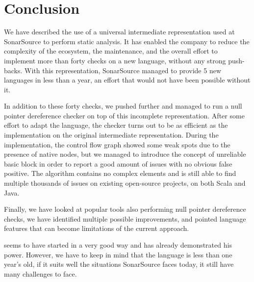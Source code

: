 \section{Conclusion}
\label{sec:conclusion}

We have described the use of a universal intermediate representation used at SonarSource to perform static analysis.
It has enabled the company to reduce the complexity of the ecosystem, the maintenance, and the overall effort to implement more than forty checks on a new language, without any strong push-backs.
With this representation, SonarSource managed to provide 5 new languages in less than a year, an effort that would not have been possible without it.

In addition to these forty checks, we pushed \slang{} further and managed to run a null pointer dereference checker on top of this incomplete representation. 
After some effort to adapt the language, the checker turns out to be as efficient as the implementation on the original intermediate representation.
During the implementation, the control flow graph showed some weak spots due to the presence of native nodes, but we managed to introduce the concept of unreliable basic block in order to report a good amount of issues with no obvious false positive.
The algorithm contains no complex elements and is still able to find multiple thousands of issues on existing open-source projects, on both Scala and Java.

Finally, we have looked at popular tools also performing null pointer dereference checks, we have identified multiple possible improvements, and pointed language features that can become limitations of the current approach.

\slang{} seems to have started in a very good way and has already demonstrated his power.
However, we have to keep in mind that the language is less than one year's old, if it suits well the situations SonarSource faces today, it still have many challenges to face.
